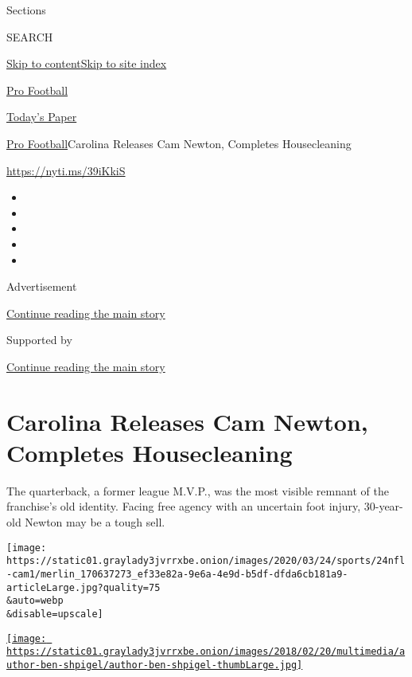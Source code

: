 Sections

SEARCH

\protect\hyperlink{site-content}{Skip to
content}\protect\hyperlink{site-index}{Skip to site index}

\href{https://www.nytimes3xbfgragh.onion/section/sports/football}{Pro
Football}

\href{https://myaccount.nytimes3xbfgragh.onion/auth/login?response_type=cookie\&client_id=vi}{}

\href{https://www.nytimes3xbfgragh.onion/section/todayspaper}{Today's
Paper}

\href{/section/sports/football}{Pro Football}\textbar{}Carolina Releases
Cam Newton, Completes Housecleaning

\url{https://nyti.ms/39iKkiS}

\begin{itemize}
\item
\item
\item
\item
\item
\end{itemize}

Advertisement

\protect\hyperlink{after-top}{Continue reading the main story}

Supported by

\protect\hyperlink{after-sponsor}{Continue reading the main story}

\hypertarget{carolina-releases-cam-newton-completes-housecleaning}{%
\section{Carolina Releases Cam Newton, Completes
Housecleaning}\label{carolina-releases-cam-newton-completes-housecleaning}}

The quarterback, a former league M.V.P., was the most visible remnant of
the franchise's old identity. Facing free agency with an uncertain foot
injury, 30-year-old Newton may be a tough sell.

\texttt{[image: https://static01.graylady3jvrrxbe.onion/images/2020/03/24/sports/24nfl-cam1/merlin\_170637273\_ef33e82a-9e6a-4e9d-b5df-dfda6cb181a9-articleLarge.jpg?quality=75\\\&auto=webp\\\&disable=upscale]}

\href{https://www.nytimes3xbfgragh.onion/by/ben-shpigel}{\texttt{[image: https://static01.graylady3jvrrxbe.onion/images/2018/02/20/multimedia/author-ben-shpigel/author-ben-shpigel-thumbLarge.jpg]}}

